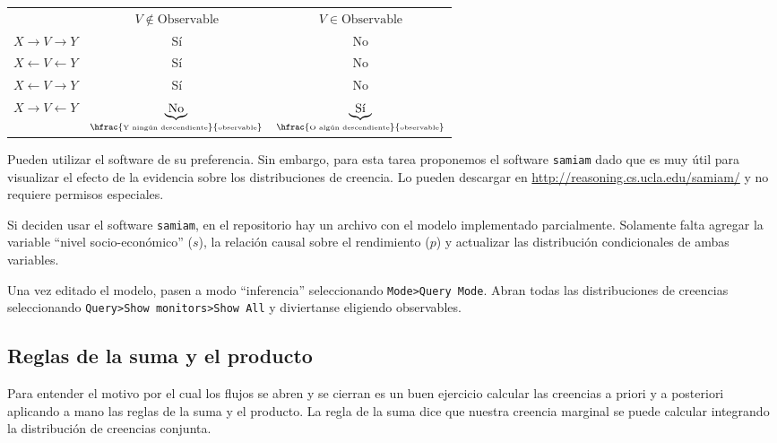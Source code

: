 \begin{table}[H]
\centering
 \begin{tabular}{c c|c}
          & $V \notin \text{Observable} $ &  $V \in \text{Observable} $ \\
 $X \rightarrow V \rightarrow Y $    &  S\'i & No \\ 
 $X \leftarrow V \leftarrow Y $      &  S\'i & No \\ 
 $X \leftarrow V \rightarrow Y $     &  S\'i & No \\
 $X \rightarrow V \leftarrow Y $     & $\underbrace{\text{No}}_{\hfrac{\text{\tiny Y ning\'un descendiente}}{ \text{\tiny observable}}}$ &  $\underbrace{\text{S\'i}}_{\hfrac{ \text{\tiny O alg\'un descendiente}}{ \text{\tiny observable}}}$
 \end{tabular} 
\end{table}

Pueden utilizar el software de su preferencia.
Sin embargo, para esta tarea proponemos el software \texttt{samiam} dado que es muy \'util para visualizar el efecto de la evidencia sobre los distribuciones de creencia.
Lo pueden descargar en \url{http://reasoning.cs.ucla.edu/samiam/} y no requiere permisos especiales.

\vspace{0.3cm}

Si deciden usar el software \texttt{samiam}, en el repositorio hay un archivo con el modelo implementado parcialmente.
Solamente falta agregar la variable ``nivel socio-econ\'omico'' ($s$), la relaci\'on causal sobre el rendimiento ($p$) y actualizar las distribuci\'on condicionales de ambas variables.

Una vez editado el modelo, pasen a modo ``inferencia'' seleccionando \texttt{Mode>Query Mode}. Abran todas las distribuciones de creencias seleccionando \texttt{Query>Show monitors>Show All} y diviertanse eligiendo observables.

\subsection{Reglas de la suma y el producto} \label{ssec:reglas}

Para entender el motivo por el cual los flujos se abren y se cierran es un buen ejercicio calcular las creencias a priori y a posteriori aplicando a mano las reglas de la suma y el producto.
La regla de la suma dice que nuestra creencia marginal se puede calcular integrando la distribuci\'on de creencias conjunta.


